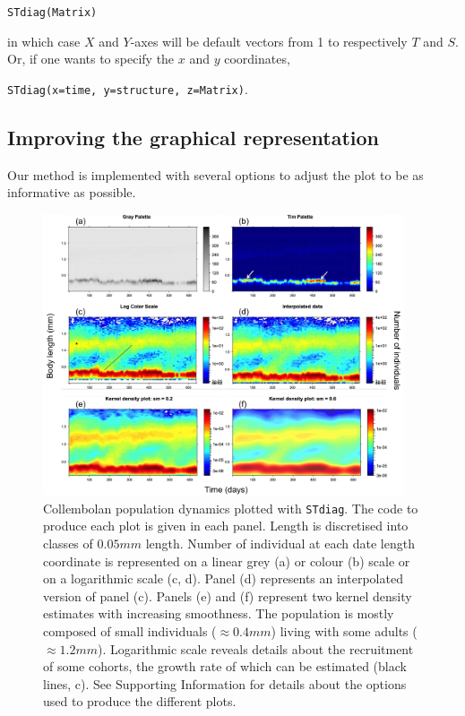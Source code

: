 \texttt{STdiag(Matrix)}

in which case $X$ and $Y$-axes will be default vectors from 1 to respectively
$T$ and $S$. Or, if one wants to specify the $x$ and $y$ coordinates,

\texttt{STdiag(x=time, y=structure, z=Matrix)}.

\subsection{Improving the graphical representation}

Our method is implemented with several options to adjust the plot to be as
informative as possible.

\begin{figure}[!ht] %
\centering
\includegraphics[width=0.95\textwidth]{2_Methodo/Fig/02}
\caption[Collembolan population dynamics plotted with
STdiag]{Collembolan population dynamics plotted with \texttt{STdiag}. The code
to produce each plot is given in each panel. Length is discretised into classes
of $0.05mm$ length. Number of individual at each date length coordinate is
represented on a linear grey (a) or colour (b) scale or on a logarithmic scale (c, d). Panel (d)
represents an interpolated version of panel (c). Panels (e) and (f) represent
two kernel density estimates with increasing smoothness. The population is
mostly composed of small individuals ($\approx 0.4mm$) living with some adults
($\approx 1.2mm$).
Logarithmic scale reveals details about the recruitment of some cohorts, the
growth rate of which can be estimated (black lines, c). See Supporting
Information for details about the options used to produce the different plots.}
\label{fig:ASTd2}
\end{figure}

